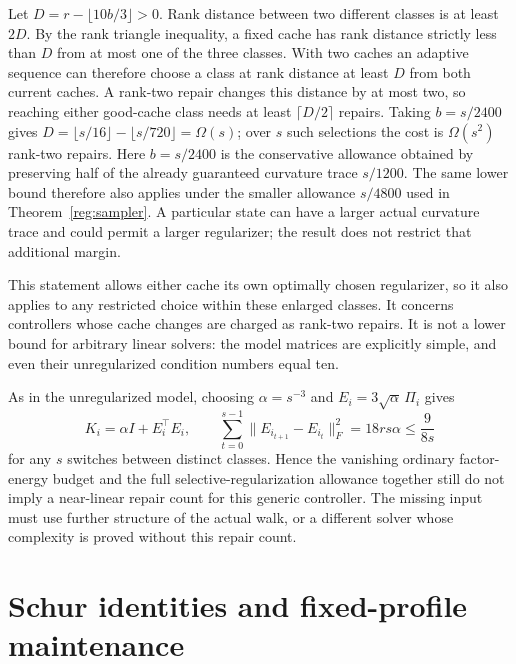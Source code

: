 \documentclass[11pt]{amsart}
\theoremstyle{definition}\newtheorem{definition}[theorem]{Definition}
\theoremstyle{remark}\newtheorem{remark}[theorem]{Remark}
\numberwithin{equation}{section}
\begin{document}
Let $D=r-\lfloor10b/3\rfloor>0$.  Rank distance between two
different classes is at least $2D$.  By the rank triangle inequality,
a fixed cache has rank distance strictly less than $D$ from at most
one of the three classes.  With two caches an adaptive sequence can
therefore choose a class at rank distance at least $D$ from both
current caches.  A rank-two repair changes this distance by at most
two, so reaching either good-cache class needs at least
$\lceil D/2\rceil$ repairs.  Taking $b=s/2400$ gives
$D=\lfloor s/16\rfloor-\lfloor s/720\rfloor=\Omega(s)$; over
$s$ such selections the cost is $\Omega(s^2)$ rank-two repairs.
Here $b=s/2400$ is the conservative allowance obtained by preserving
half of the already guaranteed curvature trace $s/1200$.
The same lower bound therefore also applies under the smaller
allowance $s/4800$ used in Theorem~\ref{reg:sampler}.  A particular
state can have a larger actual curvature trace and could permit a larger
regularizer; the result does not restrict that additional margin.

This statement allows either cache its own optimally chosen
regularizer, so it also applies to any restricted choice within these
enlarged classes.  It concerns controllers whose cache changes are
charged as rank-two repairs.  It is not a lower bound for arbitrary
linear solvers: the model matrices are explicitly simple, and even
their unregularized condition numbers equal ten.

As in the unregularized model, choosing $\alpha=s^{-3}$ and
$E_i=3\sqrt\alpha\,\Pi_i$ gives
\[
 K_i=\alpha I+E_i^\top E_i,\qquad
 \sum_{t=0}^{s-1}\|E_{i_{t+1}}-E_{i_t}\|_F^2
 =18rs\alpha\le\frac{9}{8s}
\]
for any $s$ switches between distinct classes.  Hence the vanishing
ordinary factor-energy budget and the full selective-regularization
allowance together still do not imply a near-linear repair count for
this generic controller.  The missing input must use further structure
of the actual walk, or a different solver whose complexity is proved
without this repair count.

\section{Schur identities and fixed-profile maintenance}\label{new:schur}
\end{document}
